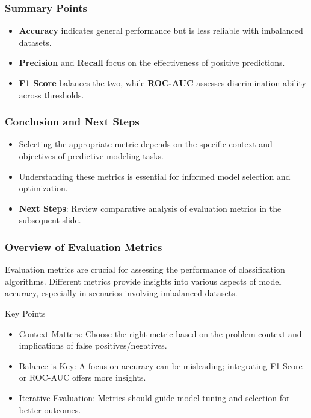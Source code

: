 \documentclass[aspectratio=169]{beamer}
\begin{document}
\begin{frame}[fragile]
    \frametitle{Summary Points}
    \begin{itemize}
        \item \textbf{Accuracy} indicates general performance but is less reliable with imbalanced datasets.
        \item \textbf{Precision} and \textbf{Recall} focus on the effectiveness of positive predictions.
        \item \textbf{F1 Score} balances the two, while \textbf{ROC-AUC} assesses discrimination ability across thresholds.
    \end{itemize}
\end{frame}

\begin{frame}[fragile]
    \frametitle{Conclusion and Next Steps}
    \begin{itemize}
        \item Selecting the appropriate metric depends on the specific context and objectives of predictive modeling tasks.
        \item Understanding these metrics is essential for informed model selection and optimization.
        \item \textbf{Next Steps}: Review comparative analysis of evaluation metrics in the subsequent slide.
    \end{itemize}
\end{frame}

\begin{frame}[fragile]
    \frametitle{Overview of Evaluation Metrics}
    Evaluation metrics are crucial for assessing the performance of classification algorithms. Different metrics provide insights into various aspects of model accuracy, especially in scenarios involving imbalanced datasets.
    
    \begin{block}{Key Points}
        \begin{itemize}
            \item Context Matters: Choose the right metric based on the problem context and implications of false positives/negatives.
            \item Balance is Key: A focus on accuracy can be misleading; integrating F1 Score or ROC-AUC offers more insights.
            \item Iterative Evaluation: Metrics should guide model tuning and selection for better outcomes.
        \end{itemize}
    \end{block}
\end{frame}
\end{document}
